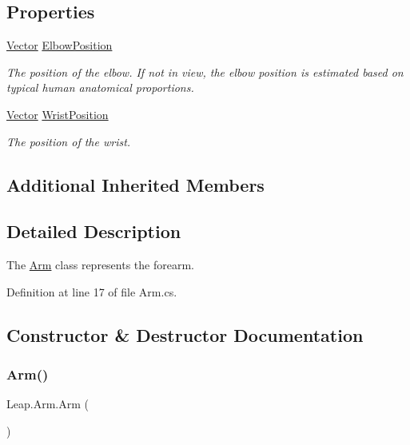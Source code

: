 \subsection*{Properties}
\begin{DoxyCompactItemize}
\item 
\mbox{\hyperlink{struct_leap_1_1_vector}{Vector}} \mbox{\hyperlink{class_leap_1_1_arm_a4249c0d34efeac222e96ba444bec5876}{Elbow\+Position}}
\begin{DoxyCompactList}\small\item\em The position of the elbow. If not in view, the elbow position is estimated based on typical human anatomical proportions. \end{DoxyCompactList}\item 
\mbox{\hyperlink{struct_leap_1_1_vector}{Vector}} \mbox{\hyperlink{class_leap_1_1_arm_a2ab323132d053651016290600610483b}{Wrist\+Position}}
\begin{DoxyCompactList}\small\item\em The position of the wrist. \end{DoxyCompactList}\end{DoxyCompactItemize}
\subsection*{Additional Inherited Members}


\subsection{Detailed Description}
The \mbox{\hyperlink{class_leap_1_1_arm}{Arm}} class represents the forearm. 



Definition at line 17 of file Arm.\+cs.



\subsection{Constructor \& Destructor Documentation}
\mbox{\label{class_leap_1_1_arm_ad59034da309d7065dd319774bb3907f3}} 
\subsubsection{\texorpdfstring{Arm()}{Arm()}\hspace{0.1cm}{\footnotesize\ttfamily [1/2]}}
{\footnotesize\ttfamily Leap.\+Arm.\+Arm (\begin{DoxyParamCaption}{ }\end{DoxyParamCaption})}



